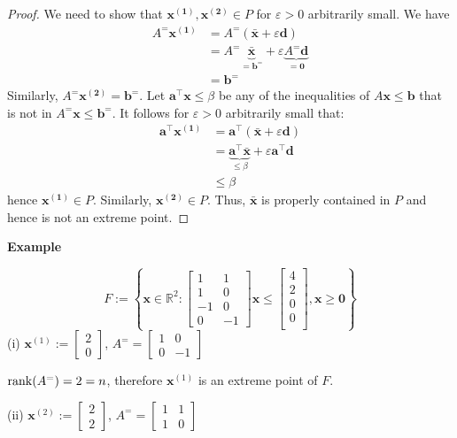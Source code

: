 \begin{proof}
We need to show that $ \bm{x^{(1)}},\bm{x^{(2)}}\in P $
for  $ \varepsilon > 0 $ arbitrarily small. We have
\begin{align*}
    A^= \bm{x^{(1)}}&=A^=(\bm{\bar{x}} + \varepsilon \bm{d})\\
    &=A^= \underbrace{\bm{\bar{x}}}_{=\bm{b^=}}
    +\varepsilon\underbrace{A^= \bm{d}}_{=\bm{0}}\\
    &=\bm{b^=}
\end{align*}
Similarly, $ A^= \bm{x^{(2)}}= \bm{b^=}$. Let $ \bm{a}^\top \bm{x}\leqslant \beta $
be any of the inequalities of $ A \bm{x}\leqslant \bm{b} $ that is not in
$ A^= \bm{x}\leqslant \bm{b}^= $. 
It follows for $ \varepsilon >0 $ arbitrarily small that:
\begin{align*}
    \bm{a}^\top \bm{x^{(1)}}&= \bm{a}^\top(\bm{\bar{x}} + \varepsilon \bm{d})\\
    &=\underbrace{\bm{a}^\top \bm{\bar{x}}}_{\leqslant \beta}+
    \varepsilon \bm{a}^\top \bm{d}\\
    &\leqslant \beta
\end{align*}
hence $ \bm{x^{(1)}}\in P $. Similarly, $ \bm{x^{(2)}}\in P $. Thus, 
$ \bm{\bar{x}} $ is properly contained in $ P $ and hence is not
an extreme point.
\end{proof}

\textbf{Example}

\[ F:=\left\{ \bm{x}\in\mathbb{R}^2: \begin{bmatrix}
    1 & 1\\
    1 & 0\\
    -1 & 0\\
    0 & -1
\end{bmatrix}\bm{x}\le
\begin{bmatrix}
    4\\
    2\\
    0\\
    0\\
\end{bmatrix}, \bm{x}\geqslant  \bm{0} \right\} \]
(i) 
$\bm{x}^{(1)}:=\begin{bmatrix}2\\0\end{bmatrix}$,
$ A^= =
\begin{bmatrix}
    1 & 0\\
    0 & -1
\end{bmatrix} $

$ \operatorname{rank}(A^=)=2=n $, therefore $\bm{x}^{(1)}$ is an extreme
point of $ F $.

(ii)
$\bm{x}^{(2)}:=\begin{bmatrix}2\\2\end{bmatrix}$,
$ A^= =
\begin{bmatrix}
    1 & 1\\
    1 & 0
\end{bmatrix} $

